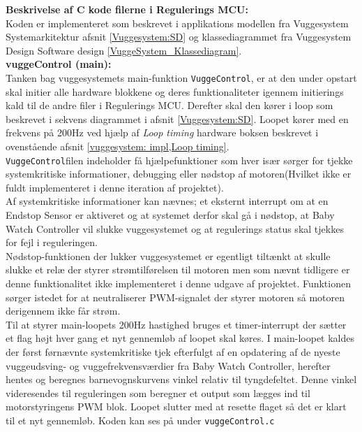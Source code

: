 \textbf{Beskrivelse af C kode filerne i Regulerings MCU:} \\
Koden er implementeret som beskrevet i applikations modellen fra Vuggesystem Systemarkitektur afsnit \vref{Vuggesystem:SD} og klassediagrammet fra Vuggesystem Design Software design \vref{VuggeSystem_Klassediagram}. \\

\textbf{vuggeControl (main):} \\
Tanken bag vuggesystemets main-funktion \verb+VuggeControl+, er at den under opstart skal initier alle hardware blokkene og deres funktionaliteter igennem initierings kald til de andre  filer i Regulerings MCU. Derefter skal den kører i loop som beskrevet i sekvens diagrammet i afsnit \vref{Vuggesystem:SD}. Loopet kører med en frekvens på 200Hz ved hjælp af \textit{Loop timing} hardware boksen beskrevet i ovenstående afsnit \vref{vuggesystem: impl,Loop timing}. \\ 

\verb+VuggeControl+filen indeholder få hjælpefunktioner som hver især sørger for tjekke systemkritiske informationer, debugging eller nødstop af motoren(Hvilket ikke er fuldt implementeret i denne iteration af projektet). \\

Af systemkritiske informationer kan nævnes; et eksternt interrupt om at en Endstop Sensor er aktiveret og at systemet derfor skal gå i nødstop, at Baby Watch Controller vil slukke vuggesystemet og at regulerings status skal tjekkes for fejl i reguleringen.\\ 

Nødstop-funktionen der lukker vuggesystemet er egentligt tiltænkt at skulle slukke et relæ der styrer strømtilførelsen til motoren men som nævnt tidligere er denne funktionalitet ikke implementeret i denne udgave af projektet. Funktionen sørger istedet for at neutraliserer PWM-signalet der styrer motoren så motoren derigennem ikke får strøm. \\ 

Til at styrer main-loopets 200Hz hastighed bruges et timer-interrupt der sætter et flag højt hver gang et nyt gennemløb af loopet skal køres. I main-loopet kaldes der først førnævnte systemkritiske tjek efterfulgt af en opdatering af de nyeste vuggeudsving- og vuggefrekvensværdier fra Baby Watch Controller, herefter hentes og beregnes barnevognskurvens vinkel relativ til tyngdefeltet. Denne vinkel videresendes til reguleringen som beregner et output som lægges ind til motorstyringens PWM blok. Loopet slutter med at resette flaget så det er klart til et nyt gennemløb. Koden kan ses på \citep{cd} under \verb+vuggeControl.c+ \\

